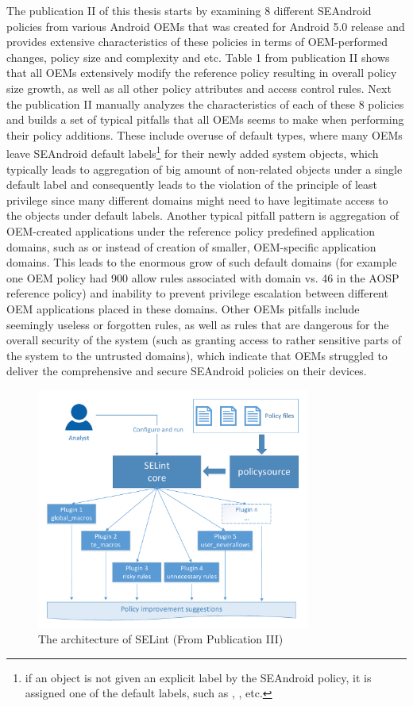 The publication II of this thesis starts by examining 8 different SEAndroid policies from various Android OEMs that was created for Android 5.0 release and provides extensive characteristics of these policies in terms of OEM-performed changes, policy size and complexity and etc. Table 1 from publication II shows that all OEMs extensively modify the reference policy resulting in overall policy size growth, as well as all other policy attributes and access control rules. Next the publication II manually analyzes the characteristics of each of these 8 policies and builds a set of typical pitfalls that all OEMs seems to make when performing their policy additions. These include overuse of default types, where many OEMs leave SEAndroid default labels\footnote{if an object is not given an explicit label by the SEAndroid policy, it is assigned one of the default labels, such as , ,  etc.} for their newly added system objects, which typically leads to aggregation of big amount of non-related objects under a single default label and consequently leads to the violation of the principle of least privilege since many different domains might need to have legitimate access to the objects under default labels. Another typical pitfall pattern is aggregation of OEM-created applications under the reference policy predefined application domains, such as  or  instead of creation of smaller, OEM-specific application domains. This leads to the enormous grow of such default domains (for example one OEM policy had 900 allow rules associated with  domain vs. 46 in the AOSP reference policy) and inability to prevent privilege escalation between different OEM applications placed in these domains. Other OEMs pitfalls include seemingly useless or forgotten rules, as well as rules that are dangerous for the overall security of the system (such as granting access to rather sensitive parts of the system to the untrusted domains), which indicate that OEMs struggled to deliver the comprehensive and secure SEAndroid policies on their devices. 

\begin{figure}[t]
	\centering
		\includegraphics[width=0.80\textwidth]{figures/selint-archi.pdf}
	\caption{The architecture of SELint (From Publication III)}
	\label{fig:selint}
\end{figure}

